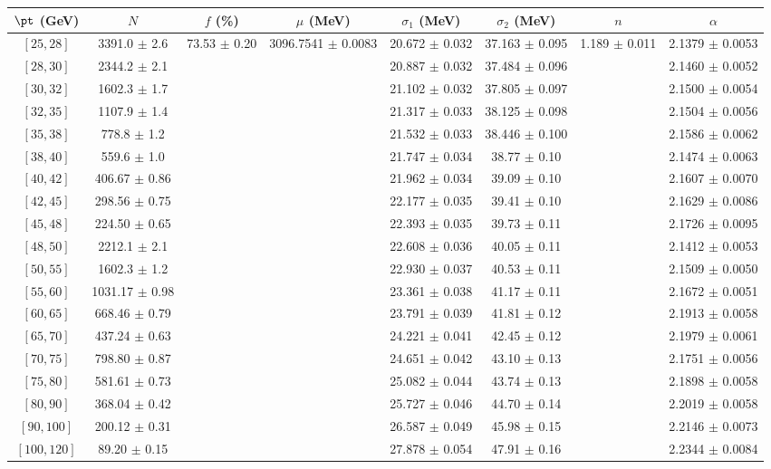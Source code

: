 \begin{tabular}{c||c|c|c|c|c|c|c}
$\pt$ (GeV) & $N$ & $f$ (\%) & $\mu$ (MeV) & $\sigma_1$ (MeV) & $\sigma_2$ (MeV) & $n$ & $\alpha$ \\
\hline
$[25, 28]$ & 3391.0 $\pm$ 2.6 & \multirow{19}{*}{73.53 $\pm$ 0.20} & \multirow{19}{*}{3096.7541 $\pm$ 0.0083} & 20.672 $\pm$ 0.032 & 37.163 $\pm$ 0.095 & \multirow{19}{*}{1.189 $\pm$ 0.011} & 2.1379 $\pm$ 0.0053\\
$[28, 30]$ & 2344.2 $\pm$ 2.1 &  &  & 20.887 $\pm$ 0.032 & 37.484 $\pm$ 0.096 &  & 2.1460 $\pm$ 0.0052\\
$[30, 32]$ & 1602.3 $\pm$ 1.7 &  &  & 21.102 $\pm$ 0.032 & 37.805 $\pm$ 0.097 &  & 2.1500 $\pm$ 0.0054\\
$[32, 35]$ & 1107.9 $\pm$ 1.4 &  &  & 21.317 $\pm$ 0.033 & 38.125 $\pm$ 0.098 &  & 2.1504 $\pm$ 0.0056\\
$[35, 38]$ & 778.8 $\pm$ 1.2 &  &  & 21.532 $\pm$ 0.033 & 38.446 $\pm$ 0.100 &  & 2.1586 $\pm$ 0.0062\\
$[38, 40]$ & 559.6 $\pm$ 1.0 &  &  & 21.747 $\pm$ 0.034 & 38.77 $\pm$ 0.10 &  & 2.1474 $\pm$ 0.0063\\
$[40, 42]$ & 406.67 $\pm$ 0.86 &  &  & 21.962 $\pm$ 0.034 & 39.09 $\pm$ 0.10 &  & 2.1607 $\pm$ 0.0070\\
$[42, 45]$ & 298.56 $\pm$ 0.75 &  &  & 22.177 $\pm$ 0.035 & 39.41 $\pm$ 0.10 &  & 2.1629 $\pm$ 0.0086\\
$[45, 48]$ & 224.50 $\pm$ 0.65 &  &  & 22.393 $\pm$ 0.035 & 39.73 $\pm$ 0.11 &  & 2.1726 $\pm$ 0.0095\\
$[48, 50]$ & 2212.1 $\pm$ 2.1 &  &  & 22.608 $\pm$ 0.036 & 40.05 $\pm$ 0.11 &  & 2.1412 $\pm$ 0.0053\\
$[50, 55]$ & 1602.3 $\pm$ 1.2 &  &  & 22.930 $\pm$ 0.037 & 40.53 $\pm$ 0.11 &  & 2.1509 $\pm$ 0.0050\\
$[55, 60]$ & 1031.17 $\pm$ 0.98 &  &  & 23.361 $\pm$ 0.038 & 41.17 $\pm$ 0.11 &  & 2.1672 $\pm$ 0.0051\\
$[60, 65]$ & 668.46 $\pm$ 0.79 &  &  & 23.791 $\pm$ 0.039 & 41.81 $\pm$ 0.12 &  & 2.1913 $\pm$ 0.0058\\
$[65, 70]$ & 437.24 $\pm$ 0.63 &  &  & 24.221 $\pm$ 0.041 & 42.45 $\pm$ 0.12 &  & 2.1979 $\pm$ 0.0061\\
$[70, 75]$ & 798.80 $\pm$ 0.87 &  &  & 24.651 $\pm$ 0.042 & 43.10 $\pm$ 0.13 &  & 2.1751 $\pm$ 0.0056\\
$[75, 80]$ & 581.61 $\pm$ 0.73 &  &  & 25.082 $\pm$ 0.044 & 43.74 $\pm$ 0.13 &  & 2.1898 $\pm$ 0.0058\\
$[80, 90]$ & 368.04 $\pm$ 0.42 &  &  & 25.727 $\pm$ 0.046 & 44.70 $\pm$ 0.14 &  & 2.2019 $\pm$ 0.0058\\
$[90, 100]$ & 200.12 $\pm$ 0.31 &  &  & 26.587 $\pm$ 0.049 & 45.98 $\pm$ 0.15 &  & 2.2146 $\pm$ 0.0073\\
$[100, 120]$ & 89.20 $\pm$ 0.15 &  &  & 27.878 $\pm$ 0.054 & 47.91 $\pm$ 0.16 &  & 2.2344 $\pm$ 0.0084\\
\end{tabular}
